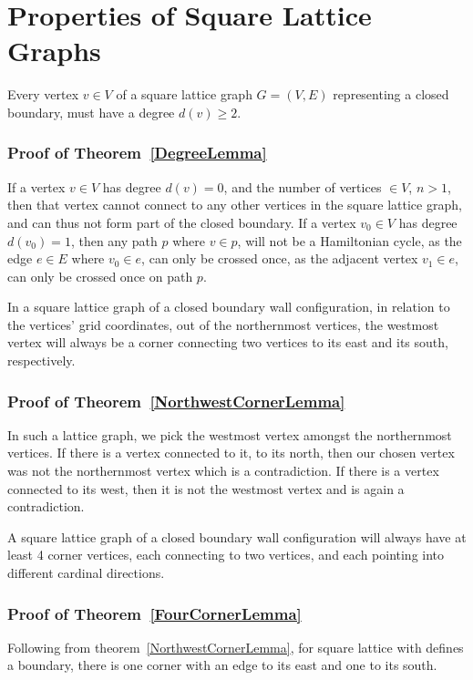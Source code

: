 \section{Properties of Square Lattice Graphs}
\begin{theorem}
Every vertex $v\in V$ of a square lattice graph $G=(V,E)$ representing a closed boundary, must have a degree $d(v)\geq 2$.\label{DegreeLemma}
\end{theorem}
\subsubsection*{Proof of Theorem~\ref{DegreeLemma}}
If a vertex $v\in V$ has degree $d(v)=0$, and the number of vertices $\in V$, $n>1$, then that vertex cannot connect to any other vertices in the square lattice graph, and can thus not form part of the closed boundary. If a vertex $v_0\in V$ has degree $d(v_0)=1$, then any path $p$ where $v\in p$, will not be a Hamiltonian cycle, as the edge $e\in E$ where $v_0\in e$, can only be crossed once, as the adjacent vertex $v_1\in e$, can only be crossed once on path $p$.
\begin{theorem}
In a square lattice graph of a closed boundary wall configuration, in relation to the vertices' grid coordinates, out of the northernmost vertices, the westmost vertex will always be a corner connecting two vertices to its east and its south, respectively.\label{NorthwestCornerLemma}
\end{theorem}
\subsubsection*{Proof of Theorem~\ref{NorthwestCornerLemma}}
In such a lattice graph, we pick the westmost vertex amongst the northernmost vertices. If there is a vertex connected to it, to its north, then our chosen vertex was not the northernmost vertex which is a contradiction. If there is a vertex connected to its west, then it is not the westmost vertex and is again a contradiction. 
\begin{theorem}
A square lattice graph of a closed boundary wall configuration will always have at least 4 corner vertices, each connecting to two vertices, and each pointing into different cardinal directions.\label{FourCornerLemma}
\end{theorem}
\subsubsection*{Proof of Theorem~\ref{FourCornerLemma}}
Following from theorem~\ref{NorthwestCornerLemma}, for square lattice with defines a boundary, there is one corner with an edge to its east and one to its south. 

